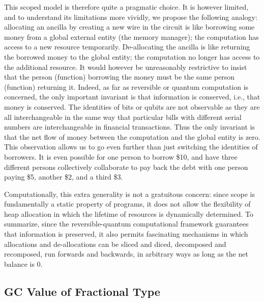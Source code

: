 \documentclass[sigplan,10pt,review,anonymous]{acmart}
\begin{document}
This scoped model is therefore quite a pragmatic choice. It is however
limited, and to understand its limitations more vividly, we propose
the following analogy: allocating an ancilla by creating a new wire in
the circuit is like borrowing some money from a global external
entity (the memory manager); the computation has access to a new resource
temporarily. De-allocating the ancilla is like returning the borrowed
money to the global entity; the computation no longer has access to
the additional resource. It would however be unreasonably restrictive
to insist that the person (function) borrowing the money must be
the same person (function) returning it.
Indeed, as far as reversible or quantum computation is concerned, the
only important invariant is that information is conserved, i.e., that
money is conserved. The identities of bits or qubits are not
observable as they are all interchangeable in the same way that
particular bills with different serial numbers are interchangeable in
financial transactions. Thus the only invariant is that the net flow
of money between the computation and the global entity is zero. This
observation allows us to go even further than just switching the
identities of borrowers. It is even possible for one person to borrow
\$10, and have three different persons collectively collaborate to
pay back the debt with one person paying \$5, another \$2, and a third
\$3.

Computationally, this extra generality is not a gratuitous concern:
since scope is fundamentally a static property of programs, it does
not allow the flexibility of heap allocation in which the lifetime of
resources is dynamically determined. To summarize, since the
reversible-quantum computational framework guarantees that information
is preserved, it also permits fascinating mechanisms in which
allocations and de-allocations can be sliced and diced, decomposed and
recomposed, run forwards and backwards, in arbitrary ways as long as
the net balance is 0.

\subsection{GC Value of Fractional Type}
 
\end{document}

